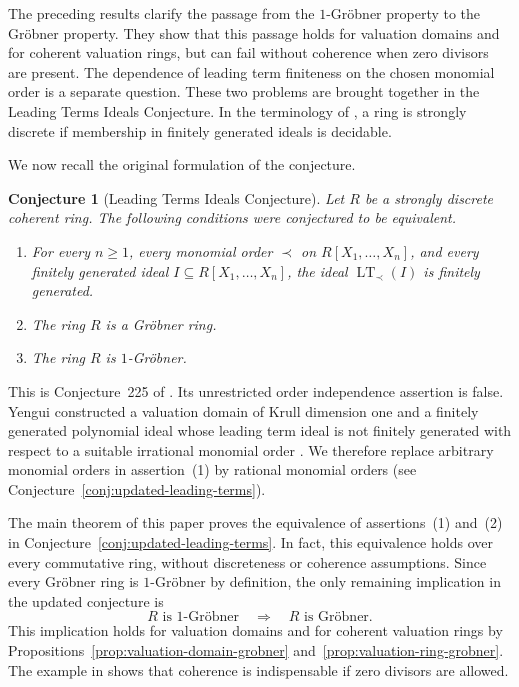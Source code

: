 \documentclass[preprint,12pt,3p]{elsarticle}
\newtheorem{conjecture}[theorem]{Conjecture}
\theoremstyle{definition}
\theoremstyle{remark}
\newcommand{\LT}{\operatorname{LT}}
\begin{document}
The preceding results clarify the passage from the $1$-Gr\"obner
property to the Gr\"obner property. They show that this passage holds
for valuation domains and for coherent valuation rings, but can fail
without coherence when zero divisors are present. The dependence of
leading term finiteness on the chosen monomial order is a separate
question. These two problems are brought together in the Leading Terms
Ideals Conjecture. In the terminology of \cite{Yengui2015Book}, a ring
is strongly discrete if membership in finitely generated ideals is
decidable.

We now recall the original formulation of the conjecture.
	
	\begin{conjecture}[Leading Terms Ideals Conjecture]
		\label{conj:leading-terms-ideals}
		Let $R$ be a strongly discrete coherent ring. The following
		conditions were conjectured to be equivalent.
		\begin{enumerate}
			\item[(1)] For every $n\geq 1$, every monomial order $\prec$
			on $R[X_1,\ldots,X_n]$, and every finitely generated ideal
			$I\subseteq R[X_1,\ldots,X_n]$, the ideal $\LT_\prec(I)$ is
			finitely generated.
			\item[(2)] The ring $R$ is a Gr\"obner ring.
			\item[(3)] The ring $R$ is $1$-Gr\"obner.
		\end{enumerate}
	\end{conjecture}
	
	This is Conjecture~225 of \cite{Yengui2015Book}. Its unrestricted
	order independence assertion is false. Yengui constructed a
	valuation domain of Krull dimension one and a finitely generated
	polynomial ideal whose leading term ideal is not finitely generated
	with respect to a suitable irrational monomial order
	\cite{Yengui2021Counterexample}. We therefore replace arbitrary
	monomial orders in assertion~{\rm(1)} by rational monomial orders (see Conjecture~\ref{conj:updated-leading-terms}).
	
	
	
	The main theorem of this paper proves the equivalence of
	assertions~{\rm(1)} and~{\rm(2)} in
	Conjecture~\ref{conj:updated-leading-terms}. In fact, this
	equivalence holds over every commutative ring, without discreteness
	or coherence assumptions. Since every Gr\"obner ring is
	$1$-Gr\"obner by definition, the only remaining implication in the
	updated conjecture is
	\[
	R\text{ is }1\text{-Gr\"obner}
	\quad\Longrightarrow\quad
	R\text{ is Gr\"obner}.
	\]
	This implication holds for valuation domains and for coherent
	valuation rings by
	Propositions~\ref{prop:valuation-domain-grobner}
	and~\ref{prop:valuation-ring-grobner}. The example in
	\cite{LiLiuZheng2017} shows that coherence is indispensable if zero
	divisors are allowed.
	
\end{document}
